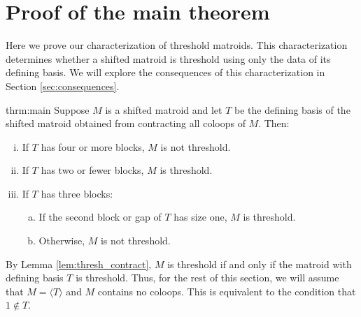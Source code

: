 \documentclass[10pt,a4paper]{amsart}
\theoremstyle{definition}
\theoremstyle{plain}
\begin{document}
\section{Proof of the main theorem}
\label{sec:main}

Here we prove our characterization of threshold matroids. This characterization determines whether a shifted matroid is threshold using only the data of its defining basis. We will explore the consequences of this characterization in Section \ref{sec:consequences}.
\begin{repintrotheorem}{thrm:main}
Suppose $M$ is a shifted matroid and let $T$ be the defining basis of the shifted matroid obtained from contracting all coloops of $M$.
Then:
\begin{enumerate}[i)]
\item \label{thrm:main_i}If $T$ has four or more blocks, $M$ is not threshold.
\item \label{thrm:main_ii}If $T$ has two or fewer blocks, $M$ is threshold.
\item If $T$ has three blocks:
\begin{enumerate}[a)]
\item \label{thrm:main_iiia}If the second block or gap of $T$ has size one, $M$ is threshold.
\item \label{thrm:main_iiib}Otherwise, $M$ is not threshold. 
\end{enumerate}
\end{enumerate}
\end{repintrotheorem}
By Lemma \ref{lem:thresh_contract}, $M$ is threshold if and only if the matroid with defining basis $T$ is threshold. Thus, for the rest of this section, we will assume that $M=\langle T \rangle$ and $M$ contains no coloops. This is equivalent to the condition that $1\not \in T$.
\end{document}
